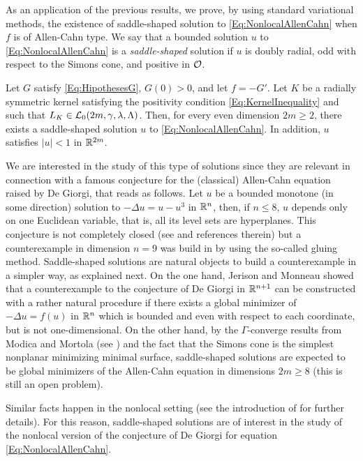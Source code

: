 As an application of the previous results, we prove, by using standard variational methods, the existence of saddle-shaped solution to \eqref{Eq:NonlocalAllenCahn} when $f$ is of Allen-Cahn type. We say that a bounded solution $u$ to \eqref{Eq:NonlocalAllenCahn} is a \emph{saddle-shaped} solution if $u$ is doubly radial, odd with respect to the Simons cone, and positive in $\mathcal{O}$. 

\begin{theorem}
	\label{Th:Existence}
    Let $G$ satisfy \eqref{Eq:HipothesesG}, $G(0)>0$, and let $f=-G'$. Let $K$ be a radially symmetric kernel satisfying the positivity condition \eqref{Eq:KernelInequality} and such that $L_K\in \mathcal{L}_0(2m, \gamma, \lambda, \Lambda)$. Then, for every even dimension $2m \geq 2$, there exists a saddle-shaped solution $u$ to \eqref{Eq:NonlocalAllenCahn}. In addition, $u$ satisfies $|u|<1$ in $\mathbb{R}^{2m}$.
\end{theorem}

We are interested in the study of this type of solutions since they are relevant in connection with a famous conjecture for the (classical) Allen-Cahn equation raised by De Giorgi, that reads as follows. Let $u$ be a bounded monotone (in some direction) solution to $-\Delta u = u - u^3$ in $\mathbb{R}^n$, then, if $n \leq 8$, $u$ depends only on one Euclidean variable, that is, all its level sets are hyperplanes. This conjecture is not completely closed (see \cite{FarinaValdinoci-DeGiorgi} and references therein) but a counterexample in dimension $n=9$ was build in \cite{delPinoKowalczykWei} by using the so-called gluing method. Saddle-shaped solutions are natural objects to build a counterexample in a simpler way, as explained next. On the one hand, Jerison and Monneau \cite{JerisonMonneau} showed that a counterexample to the conjecture of De Giorgi in $\mathbb{R}^{n+1}$ can be constructed with a rather natural procedure if there exists a global minimizer of $-\Delta u = f(u)$ in $\mathbb{R}^n$ which is bounded and even with respect to each coordinate, but is not one-dimensional. On the other hand, by the $\Gamma$-converge results from Modica and Mortola (see \cite{Modica,ModicaMortola}) and the fact that the Simons cone is the simplest nonplanar minimizing minimal surface, saddle-shaped solutions are expected to be global minimizers of the Allen-Cahn equation in dimensions $2m\geq 8$ (this is still an open problem).

Similar facts happen in the nonlocal setting (see the introduction of \cite{Felipe-Sanz-Perela:SaddleFractional} for further details). For this reason, saddle-shaped solutions are of interest in the study of the nonlocal version of the conjecture of De Giorgi for equation \eqref{Eq:NonlocalAllenCahn}.

